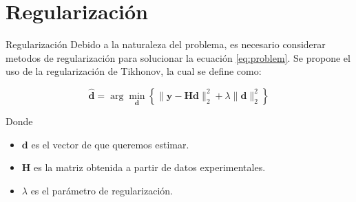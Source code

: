 \documentclass[aspectratio=169,xcolor=dvipsnames]{beamer}
\begin{document}
\section{Regularización}
\begin{frame}{Regularización}
    Debido a la naturaleza del problema, es necesario considerar metodos de regularización para solucionar la ecuación \ref{eq:problem}. Se propone el uso de la regularización de Tikhonov, la cual se define como:
    
    \begin{equation}
        \hat{\mathbf{d}} = \arg \min _{\mathbf{d}}\left\{\|\mathbf{y}-\mathbf{H} \mathbf{d}\|_{2}^{2}+\lambda\|\mathbf{d}\|_{2}^{2}\right\}
    \end{equation}

    \begin{block}{Donde}
        \begin{itemize}
            \item $\mathbf{d}$ es el vector de que queremos estimar.
            \item $\mathbf{H}$ es la matriz obtenida a partir de datos experimentales.
            \item $\lambda$ es el parámetro de regularización.
        \end{itemize}
    \end{block}
\end{frame}

\end{document}
